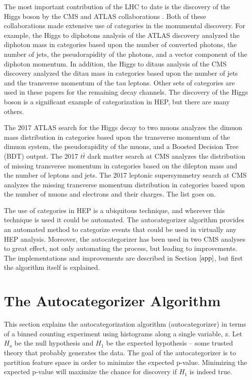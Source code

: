 \documentclass[review]{elsarticle}
\begin{document}
The most important contribution of the LHC to date is the discovery of the Higgs boson by the CMS and ATLAS collaborations \cite{atlashiggsdiscovery, cmshiggsdiscovery}. Both of these collaborations made extensive use of categories in the monumental discovery. For example, the Higgs to diphotons analysis of the ATLAS discovery analyzed the diphoton mass in categories based upon the number of converted photons, the number of jets, the pseudorapidity of the photons, and a vector component of the diphoton momentum. In addition, the Higgs to ditaus analysis of the CMS discovery analyzed the ditau mass in categories based upon the number of jets and the transverse momentum of the tau leptons. Other sets of categories are used in these papers for the remaining decay channels. The discovery of the Higgs boson is a significant example of categorization in HEP, but there are many others. 

The 2017 ATLAS search for the Higgs decay to two muons \cite{atlashmumu2017} analyzes the dimuon mass distribution in categories based upon the transverse momentum of the dimuon system, the pseudorapidity of the muons, and a Boosted Decision Tree (BDT) output. The 2017 $t\bar{t}$ dark matter search at CMS \cite{ttdmcms} analyzes the distribution of missing transverse momentum in categories based on the dilepton mass and the number of leptons and jets. The 2017 leptonic supersymmetry search at CMS \cite{susycms} analyzes the missing transverse momentum distribution in categories based upon the number of muons and electrons and their charges. The list goes on. 

The use of categories in HEP is a ubiquitous technique, and wherever this technique is used it could be automated. The autocategorizer algorithm provides an automated method to categorize events that could be used in virtually any HEP analysis. Moreover, the autocategorizer has been used in two CMS analyses to great effect, not only automating the process, but leading to improvements. The implementations and improvements are described in Section $\ref{app}$, but first the algorithm itself is explained.

\section{The Autocategorizer Algorithm}
\label{acat}
This section explains the autocategorization algorithm (autocategorizer) in terms of a binned counting experiment using histograms along a single variable, z. Let $H_o$ be the null hypothesis and $H_1$ be the expected hypothesis -- some trusted theory that probably generates the data. The goal of the autocategorizer is to partition feature space in order to minimize the expected p-value. Minimizing the expected p-value will maximize the chance for discovery if $H_1$ is indeed true.   
\end{document}
